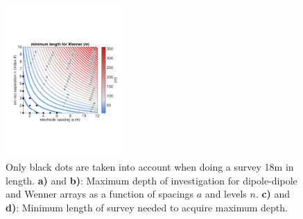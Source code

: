 \documentclass[a4paper,12pt]{article}
\begin{document}
\begin{figure}[!h]
\includegraphics[trim={20 170 30 180},clip,width=0.4\textwidth]{../pics/min-length-wenner-18m.pdf}
\caption{Only black dots are taken into account when doing a survey 18m in length. {\bf a)} and {\bf b)}: Maximum depth of investigation for dipole-dipole and Wenner arrays as a function of spacings $a$ and levels $n$. {\bf c)} and {\bf d)}: Minimum length of survey needed to acquire maximum depth.}
\label{fig:depth-length}
\end{figure}
%
%

%
%
\end{document}
